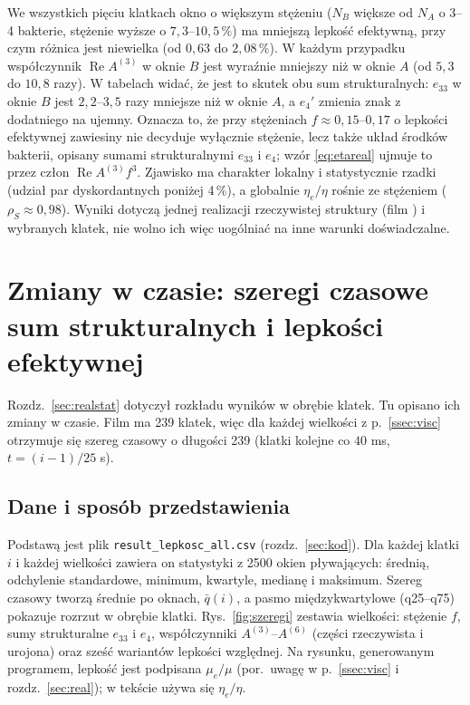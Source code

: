 \documentclass[12pt,a4paper,twoside,openright]{report}
\theoremstyle{definition}
\theoremstyle{remark}
\newcommand{\ziel}[1]{{\color{green!50!black}#1}}
\renewcommand{\Re}{\operatorname{Re}}
\begin{document}
We wszystkich pięciu klatkach okno o większym stężeniu ($N_B$ większe od $N_A$ o 3--4 bakterie, stężenie wyższe o $7{,}3$--$10{,}5\,\%$) ma mniejszą lepkość efektywną, przy czym różnica jest niewielka (od $0{,}63$ do $2{,}08\,\%$). W każdym przypadku współczynnik $\Re A^{(3)}$ w oknie $B$ jest wyraźnie mniejszy niż w oknie $A$ (od $5{,}3$ do $10{,}8$ razy). W tabelach widać, że jest to skutek obu sum strukturalnych: $e_{33}$ w oknie $B$ jest $2{,}2$--$3{,}5$ razy mniejsze niż w oknie $A$, a $e_4'$ zmienia znak z dodatniego na ujemny. Oznacza to, że przy stężeniach $f\approx0{,}15$--$0{,}17$ o lepkości efektywnej zawiesiny nie decyduje wyłącznie stężenie, lecz także układ środków bakterii, opisany sumami strukturalnymi $e_{33}$ i $e_4$; wzór \eqref{eq:etareal} ujmuje to przez człon $\Re A^{(3)}f^3$. Zjawisko ma charakter lokalny i statystycznie rzadki (udział par dyskordantnych poniżej 4\,\%), a globalnie $\eta_e/\eta$ rośnie ze stężeniem ($\rho_S\approx0{,}98$). Wyniki dotyczą jednej realizacji rzeczywistej struktury (film \cite{ariel2018collective}) i wybranych klatek, nie wolno ich więc uogólniać na inne warunki doświadczalne.


\chapter{\texorpdfstring{\ziel{Zmiany w czasie: szeregi czasowe sum strukturalnych i lepkości efektywnej}}{Zmiany w czasie: szeregi czasowe sum strukturalnych i lepkości efektywnej}}\label{sec:szeregi}

\ziel{Rozdz.~\ref{sec:realstat} dotyczył rozkładu wyników w obrębie klatek. Tu opisano ich zmiany w czasie. Film ma 239 klatek, więc dla każdej wielkości z p.~\ref{ssec:visc} otrzymuje się szereg czasowy o długości 239 (klatki kolejne co $40$ ms, $t=(i-1)/25$ s).}

\section{\ziel{Dane i sposób przedstawienia}}

\ziel{Podstawą jest plik \texttt{result\_lepkosc\_all.csv} (rozdz.~\ref{sec:kod}). Dla każdej klatki $i$ i każdej wielkości zawiera on statystyki z 2500 okien pływających: średnią, odchylenie standardowe, minimum, kwartyle, medianę i maksimum. Szereg czasowy tworzą średnie po oknach, $\bar q(i)$, a pasmo międzykwartylowe (q25--q75) pokazuje rozrzut w obrębie klatki. Rys.~\ref{fig:szeregi} zestawia wielkości: stężenie $f$, sumy strukturalne $e_{33}$ i $e_4$, współczynniki $A^{(3)}$--$A^{(6)}$ (części rzeczywista i urojona) oraz sześć wariantów lepkości względnej. Na rysunku, generowanym programem, lepkość jest podpisana $\mu_e/\mu$ (por.\ uwagę w p.~\ref{ssec:visc} i rozdz.~\ref{sec:real}); w tekście używa się $\eta_e/\eta$.}
\end{document}
